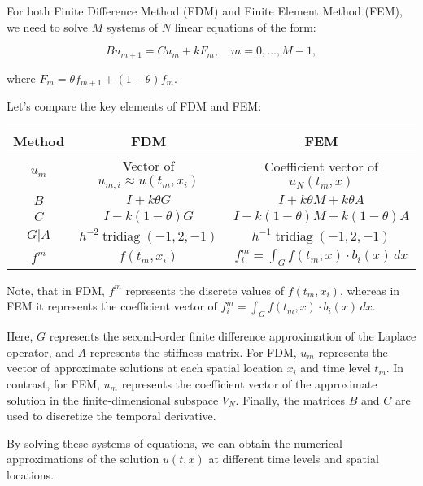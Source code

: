 For both Finite Difference Method (FDM) and Finite Element Method (FEM), we need to solve $M$ systems of $N$ linear equations of the form:

\[
Bu_{m+1} = Cu_m + kF_m, \quad m = 0, \ldots, M-1,
\]

where $F_m = \theta f_{m+1} + (1 - \theta)f_m$.

Let's compare the key elements of FDM and FEM:

\begin{center}
\begin{tabular}{|c|c|c|}
\hline
\textbf{Method} & \textbf{FDM} & \textbf{FEM} \\
\hline
$u_m$ & Vector of $u_{m,i} \approx u(t_m, x_i)$ & Coefficient vector of $u_N(t_m, x)$ \\
\hline
$B$ & $I + k\theta G$ & $I + k\theta M + k\theta A$ \\
\hline
$C$ & $I - k(1 - \theta) G$ & $I - k(1 - \theta) M - k(1 - \theta) A$ \\
\hline
$G | A$ & $h^{-2} \operatorname{tridiag}(-1, 2, -1)$ & $h^{-1} \operatorname{tridiag}(-1, 2, -1)$ \\
\hline
$f^m$ & $f(t_m, x_i)$ & $f^m_i = \int_G f(t_m, x) \cdot b_i(x) \, dx$ \\
\hline
\end{tabular}
\end{center}

Note, that in FDM, $f^m$ represents the discrete values of $f(t_m, x_i)$, whereas in FEM it represents the coefficient vector of $f^m_i = \int_G f(t_m, x) \cdot b_i(x) \, dx$.

Here, $G$ represents the second-order finite difference approximation of the Laplace operator, and $A$ represents the stiffness matrix. For FDM, $u_m$ represents the vector of approximate solutions at each spatial location $x_i$ and time level $t_m$. In contrast, for FEM, $u_m$ represents the coefficient vector of the approximate solution in the finite-dimensional subspace $V_N$. Finally, the matrices $B$ and $C$ are used to discretize the temporal derivative.

By solving these systems of equations, we can obtain the numerical approximations of the solution $u(t, x)$ at different time levels and spatial locations.